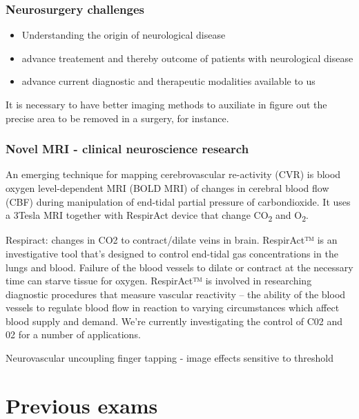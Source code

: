 \documentclass[12pt,article,oneside,a4paper]{memoir}
\begin{document}
\subsubsection{Neurosurgery challenges} 

\begin{itemize}
\item Understanding the origin of neurological disease
\item advance treatement and thereby outcome of patients with neurological disease
\item advance current diagnostic and therapeutic modalities available to us
\end{itemize}

It is necessary to have better imaging methods to auxiliate in figure out the precise area to be removed in a surgery, for instance.

\subsubsection{Novel MRI - clinical neuroscience research}
An emerging technique for mapping cerebrovascular re-activity (CVR) is blood oxygen level-dependent MRI (BOLD MRI) of changes in cerebral blood flow (CBF) during manipulation of end-tidal partial pressure of carbondioxide. It uses a 3Tesla MRI together with RespirAct device that change CO\textsubscript{2} and O\textsubscript{2}.

Respiract: changes in CO2 to contract/dilate veins in brain. RespirAct™ is an investigative tool that’s designed to control end-tidal gas concentrations in the lungs and blood. Failure of the blood vessels to dilate or contract at the necessary time can starve tissue for oxygen. RespirAct™ is involved in researching diagnostic procedures that measure vascular reactivity – the ability of the blood vessels to regulate blood flow in reaction to varying circumstances which affect blood supply and demand. We’re currently investigating the control of C02 and 02 for a number of applications. 

Neurovascular uncoupling
finger tapping - image effects
sensitive to threshold

\newpage
\section{Previous exams}
\end{document}
